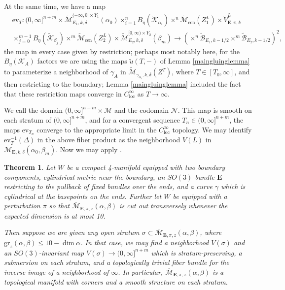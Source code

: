 \documentclass[10pt,a4paper]{amsart}
\newtheorem{theorem}{Theorem}
\theoremstyle{definition}
\theoremstyle{remark}
\numberwithin{figure}{qchap}
\begin{document}
At the same time, we have a map \begin{align*}&\text{ev}_T: (0,\infty]^{n+m} \times \widetilde{\mathcal M}_{E_1, k,\delta}^{(-\infty, 0] \times Y_1}(\alpha_0) \times_{i=1}^n B_\eta(\widetilde{\mathcal K}_{\alpha_i})\times^n \widetilde{\mathcal M}_{\text{cen}}(Z^L_1) \times \widetilde V^L_{\mathbf{E},\pi,k}\\
&\times_{j=0}^{m-1} B_\eta(\widetilde{\mathcal K}_{\beta_j}) \times^m \widetilde{\mathcal M}_{\text{cen}}(Z^L_2) \times \widetilde{\mathcal M}_{E_2,k,\delta}^{[0,\infty) \times Y_2}(\beta_m) \to \left(\times^n\widetilde{\mathcal B}_{E_1,k-1/2} \times^m \widetilde{\mathcal B}_{E_2, k-1/2}\right)^2,\end{align*} the map in every case given by restriction; perhaps most notably here, for the $B_\eta(\mathcal K_A)$ factors we are using the maps $\widetilde u(T, -)$ of Lemma \ref{maingluinglemma} to parameterize a neighborhood of $\gamma_A$ in $\widetilde{\mathcal M}_{\gamma_{\alpha_i},k,\delta}(Z^T)$, where $T \in [T_0, \infty]$, and then restricting to the boundary; Lemma \ref{maingluinglemma} included the fact that these restriction maps converge in $C^\infty_{\text{loc}}$ as $T \to \infty$.

We call the domain $(0,\infty]^{n+m} \times \mathcal M$ and the codomain $\mathcal N$. This map is smooth on each stratum of $(0, \infty]^{n+m}$, and for a convergent sequence $T_n \in (0,\infty]^{n+m}$, the maps $\text{ev}_{T_n}$ converge to the appropriate limit in the $C^\infty_{\text{loc}}$ topology. We may identify $\text{ev}_T^{-1}(\Delta)$ in the above fiber product as the neighborhood $V(L)$ in $\overline{\mathcal M}_{\mathbf{E},k,\delta}(\alpha_0, \beta_m)$. Now we may apply \cite[Lemma~19.3.3]{KMSW}.

\begin{theorem}\label{gluing-end}Let $W$ be a compact 4-manifold equipped with two boundary components, cylindrical metric near the boundary, an $SO(3)$-bundle $\mathbf{E}$ restricting to the pullback of fixed bundles over the ends, and a curve $\gamma$ which is cylindrical at the basepoints on the ends. Further let $W$ be equipped with a perturbation $\pi$ so that $\overline{\mathcal M}_{\mathbf{E}, \pi, z}(\alpha, \beta)$ is cut out transversely whenever the expected dimension is at most 10.

Then suppose we are given any open stratum $\sigma \subset \overline{\mathcal M}_{\mathbf{E}, \pi, z}(\alpha, \beta)$, where $\text{gr}_z(\alpha, \beta) \leq 10 - \dim \alpha$. In that case, we may find a neighborhood $V(\sigma)$ and an $SO(3)$-invariant map $V(\sigma) \to (0,\infty]^{n+m}$ which is stratum-preserving, a submersion on each stratum, and a topologically trivial fiber bundle for the inverse image of a neighborhood of $\infty$. In particular, $\overline{\mathcal M}_{\mathbf{E}, \pi, z}(\alpha, \beta)$ is a topological manifold with corners and a smooth structure on each stratum.
\end{theorem}
\end{document}
